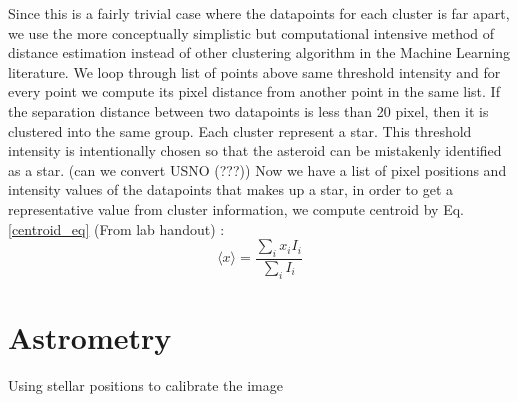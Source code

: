 \documentclass[authoryear, 12pt,5p, times]{elsarticle}
\begin{document}
Since this is a fairly trivial case where the datapoints for each cluster is far apart, we use the more conceptually simplistic but computational intensive method of distance estimation instead of other clustering algorithm in the Machine Learning literature.  We loop through list of points above same threshold intensity and for every point we compute its pixel distance from another point in the same list. If the separation distance between two datapoints is less than 20 pixel, then it is clustered into the same group. Each cluster represent a star. This threshold intensity is intentionally chosen so that the asteroid can be mistakenly identified as a star. (can we convert USNO (???)) Now we have a list of pixel positions and intensity values of the datapoints that makes up a star, in order to get a representative value from cluster information, we compute centroid by Eq. \ref{centroid_eq} (From lab handout) :
\begin{equation}
\langle x\rangle = \frac{\sum \limits_{i} x_i I_i}{\sum\limits_{i} I_i}
\label{centroid_eq}
\end{equation}

\section{Astrometry}
Using stellar positions to calibrate the image
\end{document}
